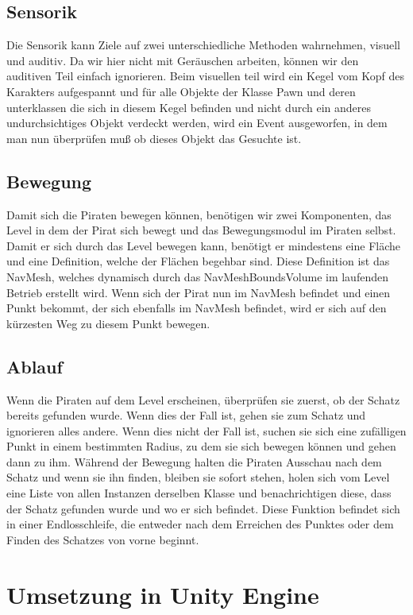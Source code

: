 \documentclass[
	12pt, %
	a4paper,
	listof=totoc, %
	bibliography=totoc, %
	numbers=noenddot, %
	ngerman, %
	headsepline, %
	oneside %
	]{scrbook} %
\begin{document}
\subsection{Sensorik}
Die Sensorik kann Ziele auf zwei unterschiedliche Methoden wahrnehmen, visuell und auditiv. Da wir hier nicht mit Geräuschen arbeiten, können wir den auditiven Teil einfach ignorieren. Beim visuellen teil wird ein Kegel vom Kopf des Karakters aufgespannt und für alle Objekte der Klasse Pawn und deren unterklassen die sich in diesem Kegel befinden und nicht durch ein anderes undurchsichtiges Objekt verdeckt werden, wird ein Event ausgeworfen, in dem man nun überprüfen muß ob dieses Objekt das Gesuchte ist.

\subsection{Bewegung}
Damit sich die Piraten bewegen können, benötigen wir zwei Komponenten, das Level in dem der Pirat sich bewegt und das Bewegungsmodul im Piraten selbst. Damit er sich durch das Level bewegen kann, benötigt er mindestens eine Fläche und eine Definition, welche der Flächen begehbar sind. Diese Definition ist das \gls{NavMesh}, welches dynamisch durch das NavMeshBoundsVolume im laufenden Betrieb erstellt wird. Wenn sich der Pirat nun im \gls{NavMesh} befindet und einen Punkt bekommt, der sich ebenfalls im \gls{NavMesh} befindet, wird er sich auf den kürzesten Weg  zu diesem Punkt bewegen.

\subsection{Ablauf}
Wenn die Piraten auf dem Level erscheinen, überprüfen sie zuerst, ob der Schatz bereits gefunden wurde. Wenn dies der Fall ist, gehen sie zum Schatz und ignorieren alles andere. Wenn dies nicht der Fall ist, suchen sie sich eine zufälligen Punkt in einem bestimmten Radius, zu dem sie sich bewegen können und gehen dann zu ihm. Während der Bewegung halten die Piraten Ausschau nach dem Schatz und wenn sie ihn finden, bleiben sie sofort stehen, holen sich vom Level eine Liste von allen Instanzen derselben Klasse und benachrichtigen diese, dass der Schatz gefunden wurde und wo er sich befindet.
Diese Funktion befindet sich in einer Endlosschleife, die entweder nach dem Erreichen des Punktes oder dem Finden des Schatzes von vorne beginnt.

\section{Umsetzung in Unity Engine}
\end{document}
